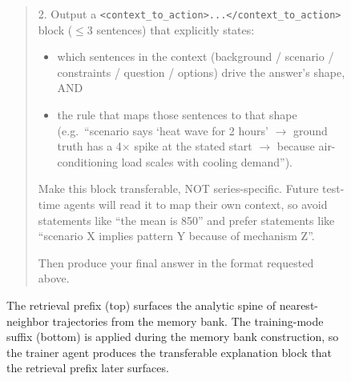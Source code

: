\begin{figure}[h]
{\begin{tcolorbox}[
colback=gray!5!white, colframe=blue!70,
title=Prompt Template B.3: Memory-Retrieval Prefix and Training-Mode Suffix,
boxrule=0.3mm, width=1.2\textwidth, arc=2mm, auto outer arc=true]
\begin{quote}
2. Output a \texttt{<context\_to\_action>...</context\_to\_action>} block
($\leq$3 sentences) that explicitly states:
\begin{itemize}
\item which sentences in the context (background / scenario / constraints /
question / options) drive the answer's shape, AND
\item the rule that maps those sentences to that shape (e.g.\ ``scenario says
`heat wave for 2 hours' $\to$ ground truth has a 4$\times$ spike at the
stated start $\to$ because air-conditioning load scales with cooling
demand'').
\end{itemize}

Make this block transferable, NOT series-specific. Future test-time
agents will read it to map their own context, so avoid statements like ``the mean is 850'' and prefer statements like ``scenario X implies pattern Y because of mechanism Z''.

\medskip
Then produce your final answer in the format requested above.



\end{quote}
\end{tcolorbox}}
\caption{
The retrieval prefix (top) surfaces the
analytic spine of nearest-neighbor trajectories from the memory bank.
The training-mode suffix (bottom) is applied during the memory bank
construction, so the trainer agent produces the transferable explanation
block that the retrieval prefix later surfaces.
}
\label{fig:prompt_augments}
\end{figure}

